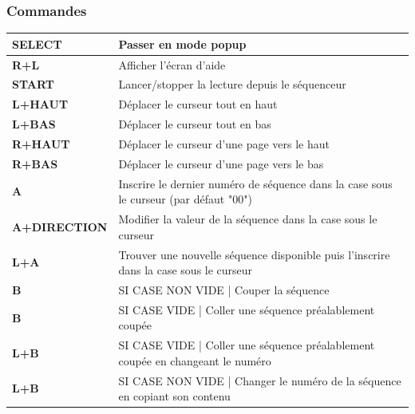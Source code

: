 \documentclass[12pt,a4paper]{article}
\begin{document}
    
        \subsubsection{Commandes}
        
        \tablelasttail{\hline}
        \begin{supertabular}{|l|p{11cm}|}
        \hline
            {\bf SELECT} & Passer en mode popup \\
            \hline
            {\bf R+L} & Afficher l'écran d'aide \\
            \hline
            {\bf START} & Lancer/stopper la lecture depuis le séquenceur \\
            \hline
            {\bf L+HAUT} & Déplacer le curseur tout en haut \\
            \hline
            {\bf L+BAS} & Déplacer le curseur tout en bas \\
            \hline
            {\bf R+HAUT} & Déplacer le curseur d'une page vers le haut \\
            \hline
            {\bf R+BAS} & Déplacer le curseur d'une page vers le bas \\
            \hline
            {\bf A} & Inscrire le dernier numéro de séquence dans la case sous le curseur (par défaut "00") \\
            \hline
            {\bf A+DIRECTION} & Modifier la valeur de la séquence dans la case sous le curseur \\
            \hline
            {\bf L+A} & Trouver une nouvelle séquence disponible puis l'inscrire dans la case sous le curseur \\
            \hline
            {\bf B} & SI CASE NON VIDE | Couper la séquence \\
            \hline
            {\bf B} & SI CASE VIDE | Coller une séquence préalablement coupée \\
            \hline
            {\bf L+B} & SI CASE VIDE | Coller une séquence préalablement coupée en changeant le numéro \\
            \hline
            {\bf L+B} & SI CASE NON VIDE | Changer le numéro de la séquence en copiant son contenu \\
        \hline
        \end{supertabular}
        
\end{document}
